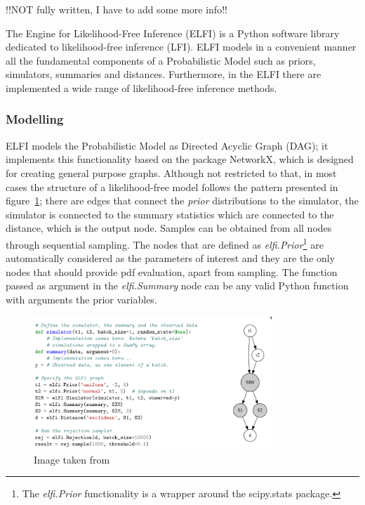 !!NOT fully written, I have to add some more info!!

The Engine for Likelihood-Free Inference (ELFI) \cite{1708.00707} is a Python software library dedicated to likelihood-free inference (LFI). ELFI models in a convenient manner all the fundamental components of a Probabilistic Model such as priors, simulators, summaries and distances. Furthermore, in the ELFI there are implemented a wide range of likelihood-free inference methods.

\subsubsection{Modelling}
\label{sec:modelling}

ELFI models the Probabilistic Model as Directed Acyclic Graph (DAG);
it implements this functionality based on the package NetworkX, which
is designed for creating general purpose graphs. Although not
restricted to that, in most cases the structure of a likelihood-free
model follows the pattern presented in figure~\ref{fig:elfi-model};
there are edges that connect the \textit{prior} distributions to the
simulator, the simulator is connected to the summary statistics which
are connected to the distance, which is the output node. Samples can
be obtained from all nodes through sequential sampling. The nodes that
are defined as \textit{elfi.Prior}\footnote{The \textit{elfi.Prior}
  functionality is a wrapper around the scipy.stats package.} are
automatically considered as the parameters of interest and they are
the only nodes that should provide pdf evaluation, apart from
sampling. The function passed as argument in the \textit{elfi.Summary}
node can be any valid Python function with arguments the prior
variables.

\begin{figure}[!ht]
    \begin{center}
      \includegraphics[width=0.8\textwidth]{./Thesis/images/chapter2/elfi.png}
    \end{center}
    \caption{Image taken from \cite{1708.00707}}
    \label{fig:elfi-model}
\end{figure}


